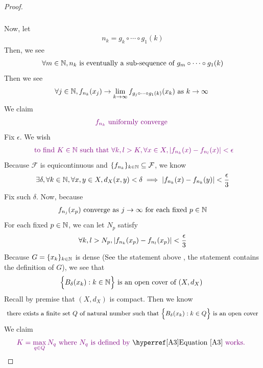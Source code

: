 \documentclass{report}
\begin{document}
\begin{proof}
\begin{align*}
\begin{matrix}
\end{matrix}
\end{align*}
Now, let 
\begin{align*}
n_k=g_k\circ \cdots \circ  g_1(k)
\end{align*}
Then, we see 
\begin{align*}
\forall m \in\mathbb{N}, n_k\text{ is eventually a sub-sequence of }g_m\circ \dots \circ  g_1(k)
\end{align*}
Then we see 
\begin{align*}
\forall j\in\mathbb{N}, f_{n_k}(x_j)\to \lim_{k\to \infty}f_{g_j\circ \cdots \circ  g_1(k)}(x_k)\text{ as $k \to \infty$ }
\end{align*}
We claim 
\begin{align*}
\textcolor{violet}{f_{n_k}\text{ uniformly converge }}
\end{align*}
Fix $\epsilon$. We wish  
 \begin{align*}
\textcolor{violet}{\text{ to find }K\in\mathbb{N}\text{ such that }\forall k,l>K, \forall x \in X, \left|f_{n_k}(x)-f_{n_l}(x)\right|<\epsilon  }
\end{align*}
Because $\mathcal{F}$ is equicontinuous and $\{ f_{n_k} \}_{k \in\mathbb{N}}\subseteq \mathcal{F}$, we know 
\begin{align}
\label{A2}
\exists \delta , \forall k \in\mathbb{N}, \forall x,y \in X , d_X(x,y)<\delta \implies \left|f_{n_k}(x)-f_{n_k}(y)\right|<\frac{\epsilon}{3}
\end{align}
Fix such $\delta$. Now, because 
 \begin{align*}
f_{n_j}(x_p)\text{ converge as $j\to \infty$ for each fixed $p\in\mathbb{N}$}
\end{align*}
For each fixed $p\in\mathbb{N}$, we can let $N_p$ satisfy 
 \begin{align}
  \label{A3}
\forall k,l>N_p, \left|f_{n_k}(x_p)-f_{n_l}(x_p)\right|<\frac{\epsilon}{3}
\end{align}
Because $G=\{ x_k \}_{k\in\mathbb{N}}$ is dense (See the statement above , the statement contains the definition of $G$), we see that 
\begin{align*}
\Big\{ B_{\delta}(x_k):k\in\mathbb{N} \Big\}\text{ is an open cover of $(X,d_X)$ }
\end{align*}
Recall by premise that $(X,d_X)$ is compact. Then we know 
\begin{align}
\label{A4}
\text{ there exists a finite set $Q$ of natural number such that $\Big\{ B_\delta (x_k):k\in Q \Big\}$ is an open cover } 
\end{align}
We claim 
\begin{align}
\label{A5}
  \vi{K=\max_{q \in Q}N_q\text{ where $N_q$ is defined by}}\text{ \myref{Equation}{A3}}\vi{\text{ works. }} 

\end{align}
\end{proof}
\end{document}
